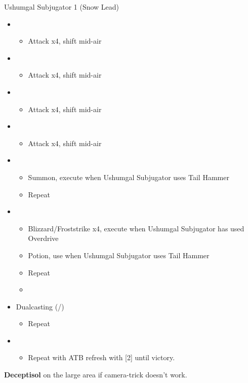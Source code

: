 \begin{multicols}{2}
\renewcommand{\sixth}{[6] Dualcasting (\rav/\rav)}
\begin{battle}{Ushumgal Subjugator 1 (Snow Lead)}
\begin{itemize}
    \item \first
    \begin{itemize}
        \item Attack x4, shift mid-air
    \end{itemize}
    \item \second
    \begin{itemize}
        \item Attack x4, shift mid-air
    \end{itemize}
    \item \first
    \begin{itemize}
        \item Attack x4, shift mid-air
    \end{itemize}
    \item \second
    \begin{itemize}
        \item Attack x4, shift mid-air
    \end{itemize}
    \item \first
    \begin{itemize}
        \item Summon, execute when Ushumgal Subjugator uses Tail Hammer
        \item Repeat
     \end{itemize}
    \item \fifth
    \begin{itemize}
        \item Blizzard/Froststrike x4, execute when Ushumgal Subjugator has used Overdrive
        \item Potion, use when Ushumgal Subjugator uses Tail Hammer
        \item Repeat
        \item \stagger
    \end{itemize}
    \item \sixth
    \begin{itemize}
        \item Repeat
    \end{itemize}
    \item \first
    \begin{itemize}
        \item Repeat with ATB refresh with [2] until victory.
    \end{itemize}
\end{itemize}
\end{battle}

\textbf{Deceptisol} on the large area if camera-trick doesn't work.
\vfill
\end{multicols}
